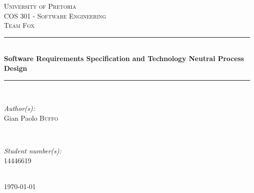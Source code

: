 \documentclass[a4paper,12pt]{article}
\begin{document}
\begin{titlepage}

\newcommand{\HRule}{\rule{\linewidth}{0.5mm}} %

\center %
 

\textsc{\LARGE University of Pretoria}\\[1.5cm] %
\textsc{\Large COS 301 - Software Engineering}\\[0.5cm] %
\textsc{\large Team Fox}\\[0.5cm] %


\HRule \\[0.4cm]
{ \huge \bfseries Software Requirements Specification and Technology Neutral Process Design}\\[0.4cm] %
\HRule \\[1.5cm]
 

\begin{minipage}{0.4\textwidth}
\begin{flushleft} \large
\emph{Author(s):}\\
Gian Paolo \textsc{Buffo} %
\end{flushleft}
\end{minipage}
~
\begin{minipage}{0.4\textwidth}
\begin{flushright} \large
\emph{Student number(s):} \\
14446619 %
\end{flushright}
\end{minipage}\\[4cm]



{\large \today}\\[3cm] %

 

\vfill %

\end{titlepage}
\end{document}
